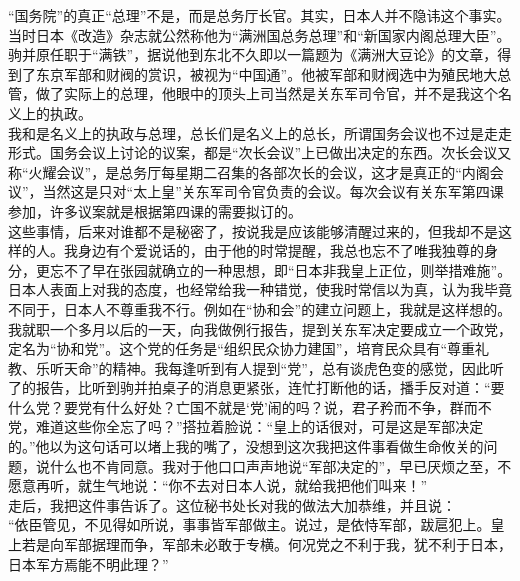 “国务院”的真正“总理”不是，而是总务厅长官。其实，日本人并不隐讳这个事实。当时日本《改造》杂志就公然称他为“满洲国总务总理”和“新国家内阁总理大臣”。驹并原任职于“满铁”，据说他到东北不久即以一篇题为《满洲大豆论》的文章，得到了东京军部和财阀的赏识，被视为“中国通”。他被军部和财阀选中为殖民地大总管，做了实际上的总理，他眼中的顶头上司当然是关东军司令官，并不是我这个名义上的执政。\\

我和是名义上的执政与总理，总长们是名义上的总长，所谓国务会议也不过是走走形式。国务会议上讨论的议案，都是“次长会议”上已做出决定的东西。次长会议又称“火耀会议”，是总务厅每星期二召集的各部次长的会议，这才是真正的“内阁会议”，当然这是只对“太上皇”关东军司令官负责的会议。每次会议有关东军第四课参加，许多议案就是根据第四课的需要拟订的。\\

这些事情，后来对谁都不是秘密了，按说我是应该能够清醒过来的，但我却不是这样的人。我身边有个爱说话的，由于他的时常提醒，我总也忘不了唯我独尊的身分，更忘不了早在张园就确立的一种思想，即“日本非我皇上正位，则举措难施”。日本人表面上对我的态度，也经常给我一种错觉，使我时常信以为真，认为我毕竟不同于，日本人不尊重我不行。例如在“协和会”的建立问题上，我就是这样想的。\\

我就职一个多月以后的一天，向我做例行报告，提到关东军决定要成立一个政党，定名为“协和党”。这个党的任务是“组织民众协力建国”，培育民众具有“尊重礼教、乐听天命”的精神。我每逢听到有人提到“党”，总有谈虎色变的感觉，因此听了的报告，比听到驹并拍桌子的消息更紧张，连忙打断他的话，播手反对道：“要什么党？要党有什么好处？亡国不就是‘党’闹的吗？说，君子矜而不争，群而不党，难道这些你全忘了吗？”搭拉着脸说：“皇上的话很对，可是这是军部决定的。”他以为这句话可以堵上我的嘴了，没想到这次我把这件事看做生命攸关的问题，说什么也不肯同意。我对于他口口声声地说“军部决定的”，早已厌烦之至，不愿意再听，就生气地说：“你不去对日本人说，就给我把他们叫来！”\\

走后，我把这件事告诉了。这位秘书处长对我的做法大加恭维，并且说：\\

“依臣管见，不见得如所说，事事皆军部做主。说过，是依恃军部，跋扈犯上。皇上若是向军部据理而争，军部未必敢于专横。何况党之不利于我，犹不利于日本，日本军方焉能不明此理？”\\

